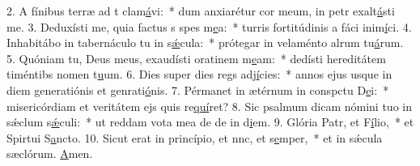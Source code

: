 2. A fínibus terræ ad t clam\uline{á}vi:~* dum anxiarétur cor meum, in petr exalt\uline{á}sti me.
3. Deduxísti me, quia factus s spes m\uline{e}a:~* turris fortitúdinis a fáci inim\uline{í}ci.
4. Inhabitábo in tabernáculo tu in s\uline{ǽ}cula:~* prótegar in velaménto alrum tu\uline{á}rum.
5. Quóniam tu, Deus meus, exaudísti oratinem m\uline{e}am:~* dedísti hereditátem timéntibs nomen t\uline{u}um.
6. Dies super dies regs adj\uline{í}cies:~* annos ejus usque in diem generatiónis et genrati\uline{ó}nis.
7. Pérmanet in ætérnum in conspctu D\uline{e}i:~* misericórdiam et veritátem ejs quis re\uline{quí}ret?
8. Sic psalmum dicam nómini tuo in sǽclum s\uline{ǽ}culi:~* ut reddam vota mea de de in d\uline{i}em.
9. Glória Patr, et F\uline{í}lio,~* et Spirtui S\uline{a}ncto.
10. Sicut erat in princípio, et nnc, et s\uline{e}mper,~* et in sǽcula sæclórum. \uline{A}men.

